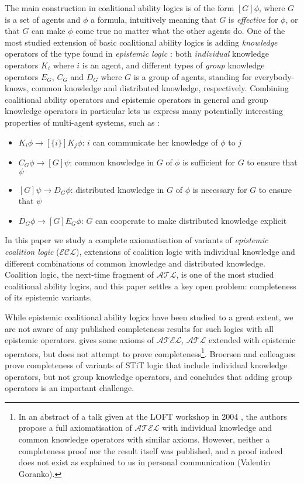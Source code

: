 \documentclass{article}
\newcommand{\acro}[1]{\ensuremath{\mathcal{#1}}}
\begin{document}
The main construction in coalitional ability logics is of the form
$[G]\phi$, where $G$ is a set of agents and $\phi$ a formula,
intuitively meaning that $G$ is \emph{effective} for $\phi$, or that
$G$ can make $\phi$ come true no matter what the other agents do.  One
of the most studied extension of basic coalitional ability logics is
adding \emph{knowledge} operators of the type found in \emph{epistemic
  logic} \cite{Fagin1995,Meyer1995}: both \emph{individual} knowledge
operators $K_i$ where $i$ is an agent, and different types of
\emph{group} knowledge operators $E_G$, $C_G$ and $D_G$ where $G$ is a
group of agents, standing for everybody-knows, common knowledge and
distributed knowledge, respectively. Combining coalitional ability
operators and epistemic operators in general and group knowledge
operators in particular lets us express many potentially interesting
properties of multi-agent systems, such as \cite{Hoek2003a}:
\begin{itemize}
\item $K_i \phi \rightarrow [\{i\}]K_j \phi$: $i$ can communicate her
  knowledge of $\phi$ to $j$
\item $C_G \phi \rightarrow [G]\psi$: common knowledge in $G$ of
  $\phi$ is sufficient for $G$ to ensure that $\psi$
\item $[G]\psi \rightarrow D_G \phi$: distributed knowledge in $G$ of
  $\phi$ is necessary for $G$ to ensure that $\psi$
\item $D_G\phi \rightarrow [G]E_G\phi$: $G$ can cooperate to make
  distributed knowledge explicit
\end{itemize}

In this paper we study a complete axiomatisation of variants of
\emph{epistemic coalition logic} (\acro{ECL}), extensions of coalition
logic with individual knowledge and different combinations of common
knowledge and distributed knowledge. Coalition logic, the next-time
fragment of \acro{ATL}, is one of the most studied coalitional ability
logics, and this paper settles a key open problem: completeness of its
epistemic variants.

While epistemic coalitional ability logics have been studied to a
great extent, we are not aware of any published completeness results
for such logics with all epistemic operators. \cite{Hoek2003a} gives
some axioms of \acro{ATEL}, \acro{ATL} extended with epistemic
operators, but does not attempt to prove completeness\footnote{In an
  abstract of a talk given at the LOFT workshop in 2004
  \cite{goranko:2004}, the authors propose a full axiomatisation of
  \acro{ATEL} with individual knowledge and common knowledge operators
  with similar axioms. However, neither a completeness proof nor the result
  itself was published, and a proof indeed does not exist as explained
  to us in personal communication (Valentin Goranko).}.  Broersen and
colleagues \cite{BroersenDALT2008,BroersenHerzigTroquardJANCL2009}
prove completeness of variants of STiT logic that include individual
knowledge operators, but not group knowledge operators, and
\cite{BroersenHerzigTroquardJANCL2009} concludes that adding group
operators is an important challenge.
\end{document}
